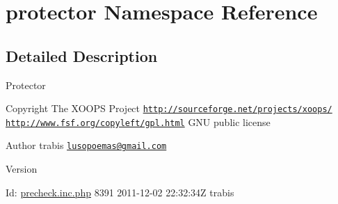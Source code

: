 \hypertarget{namespaceprotector}{\section{protector Namespace Reference}
\label{namespaceprotector}
}


\subsection{Detailed Description}
Protector

\begin{DoxyCopyright}{Copyright}
The X\-O\-O\-P\-S Project \href{http://sourceforge.net/projects/xoops/}{\tt http\-://sourceforge.\-net/projects/xoops/}  \href{http://www.fsf.org/copyleft/gpl.html}{\tt http\-://www.\-fsf.\-org/copyleft/gpl.\-html} G\-N\-U public license
\end{DoxyCopyright}
\begin{DoxyAuthor}{Author}
trabis \href{mailto:lusopoemas@gmail.com}{\tt lusopoemas@gmail.\-com} 
\end{DoxyAuthor}
\begin{DoxyVersion}{Version}

\end{DoxyVersion}
\begin{DoxyParagraph}{Id\-:}
\hyperlink{precheck_8inc_8php}{precheck.\-inc.\-php} 8391 2011-\/12-\/02 22\-:32\-:34\-Z trabis 
\end{DoxyParagraph}
